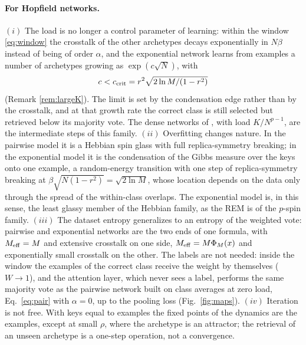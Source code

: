 \documentclass[11pt,a4paper]{article}
\newcommand{\Meff}{M_{\rm eff}}
\begin{document}
\paragraph{For Hopfield networks.} $(i)$ The load is no longer a control parameter of learning: within the window \eqref{eq:window} the crosstalk of the other archetypes decays exponentially in $N\beta$ instead of being of order $\alpha$, and the exponential network learns from examples a number of archetypes growing as $\exp(c\sqrt N)$, with
\begin{equation*}
c<c_{\rm crit}=r^2\sqrt{2\ln M/(1-r^2)}
\end{equation*}
(Remark \ref{rem:largeK}). The limit is set by the condensation edge rather than by the crosstalk, and at that growth rate the correct class is still selected but retrieved below its majority vote. The dense networks of \cite{Agliari2023sup,Agliari2023unsup}, with load $K/N^{p-1}$, are the intermediate steps of this family. $(ii)$ Overfitting changes nature. In the pairwise model it is a Hebbian spin glass with full replica-symmetry breaking; in the exponential model it is the condensation of the Gibbs measure over the keys onto one example, a random-energy transition with one step of replica-symmetry breaking at $\beta\sqrt{N(1-r^2)}=\sqrt{2\ln M}$, whose location depends on the data only through the spread of the within-class overlaps. The exponential model is, in this sense, the least glassy member of the Hebbian family, as the REM is of the $p$-spin family. $(iii)$ The dataset entropy generalizes to an entropy of the weighted vote: pairwise and exponential networks are the two ends of one formula, with $\Meff=M$ and extensive crosstalk on one side, $\Meff=M\Phi_M(x)$ and exponentially small crosstalk on the other. The labels are not needed: inside the window the examples of the correct class receive the weight by themselves ($W\to1$), and the attention layer, which never sees a label, performs the same majority vote as the pairwise network built on class averages at zero load, Eq.\ \eqref{eq:pair} with $\alpha=0$, up to the pooling loss (Fig.\ \ref{fig:maps}). $(iv)$ Iteration is not free. With keys equal to examples the fixed points of the dynamics are the examples, except at small $\rho$, where the archetype is an attractor; the retrieval of an unseen archetype is a one-step operation, not a convergence.
\end{document}
